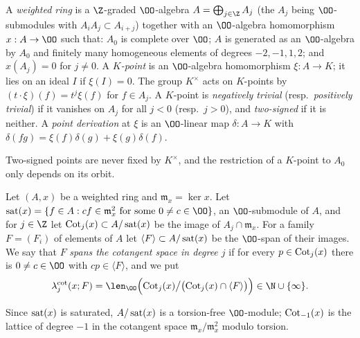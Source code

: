 \begin{definition}\label{pf:vwin-he:wring}
A \emph{weighted ring} is a $\Z$-graded $\OO$-algebra $A=\bigoplus_{j\in\Z}A_j$ (the $A_j$ being $\OO$-submodules
with $A_iA_j\subset A_{i+j}$) together with an $\OO$-algebra homomorphism $x:A\to\OO$ such that: $A_0$ is complete
over $\OO$; $A$ is generated as an $\OO$-algebra by $A_0$ and finitely many homogeneous elements of degrees
$-2,-1,1,2$; and $x(A_j)=0$ for $j\ne0$. A \emph{$K$-point} is an $\OO$-algebra homomorphism $\xi:A\to K$; it lies
on an ideal $I$ if $\xi(I)=0$. The group $K^\times$ acts on $K$-points by $(t\cdot\xi)(f)=t^j\xi(f)$ for $f\in A_j$.
A $K$-point is \emph{negatively trivial} (resp.\ \emph{positively trivial}) if it vanishes on $A_j$ for all $j<0$
(resp.\ $j>0$), and \emph{two-signed} if it is neither. A \emph{point derivation} at $\xi$ is an $\OO$-linear map
$\delta:A\to K$ with $\delta(fg)=\xi(f)\delta(g)+\xi(g)\delta(f)$.
\end{definition}

Two-signed points are never fixed by $K^\times$, and the restriction of a $K$-point to $A_0$ only depends on its
orbit.

\begin{definition}\label{pf:vwin-he:cot}
Let $(A,x)$ be a weighted ring and $\mathfrak m_x=\ker x$. Let $\vwinhesat(x)=\{f\in A: cf\in\mathfrak m_x^2\
\text{for some}\ 0\ne c\in\OO\}$, an $\OO$-submodule of $A$, and for $j\in\Z$ let
$\operatorname{Cot}_j(x)\subset A/\operatorname{sat}(x)$ be the image of $A_j\cap\mathfrak m_x$. For a family $F=(F_i)$ of elements
of $A$ let $\langle F\rangle\subset A/\operatorname{sat}(x)$ be the $\OO$-span of their images. We say that $F$
\emph{spans the cotangent space in degree $j$} if for every $p\in\operatorname{Cot}_j(x)$ there is $0\ne c\in\OO$ with
$cp\in\langle F\rangle$, and we put
\[
 \vwinhecotlen_j(x;F)=\len_\OO\Bigl(\vwinhecot_j(x)\big/\bigl(\vwinhecot_j(x)\cap\langle F\rangle\bigr)\Bigr)\in\N\cup\{\infty\}.
\]
\end{definition}

Since $\operatorname{sat}(x)$ is saturated, $A/\operatorname{sat}(x)$ is a torsion-free $\OO$-module; $\operatorname{Cot}_{-1}(x)$ is the
lattice of degree $-1$ in the cotangent space $\mathfrak m_x/\mathfrak m_x^2$ modulo torsion.

